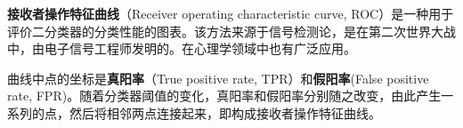 
\textbf{接收者操作特征曲线}（Receiver operating characteristic curve, ROC）是一种用于评价二分类器的分类性能的图表。该方法来源于信号检测论，是在第二次世界大战中，由电子信号工程师发明的。在心理学领域中也有广泛应用。

曲线中点的坐标是\textbf{真阳率}（True positive rate, TPR）和\textbf{假阳率}(False positive rate, FPR)。随着分类器阈值的变化，真阳率和假阳率分别随之改变，由此产生一系列的点，然后将相邻两点连接起来，即构成接收者操作特征曲线。